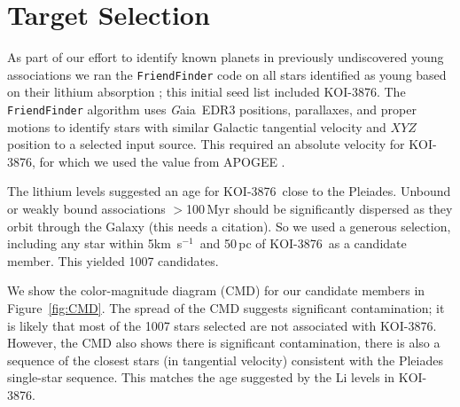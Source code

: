 \documentclass[twocolumn]{aastex631}
\newcommand{\starname}{KOI-3876}
\newcommand\kms{km~s$^{-1}$}
\newcommand{\gaia}{{\textit Gaia}}
\begin{document}
\section{Target Selection}\label{sec:target}

As part of our effort to identify known planets in previously undiscovered young associations we ran the \texttt{FriendFinder} code \citep{THYMEV} on all stars identified as young based on their lithium absorption \citep{2018ApJ...855..115B}; this initial seed list included \starname. The \texttt{FriendFinder} algorithm uses \gaia\ EDR3 positions, parallaxes, and proper motions to identify stars with similar Galactic tangential velocity and $XYZ$ position to a selected input source. This required an absolute velocity for \starname, for which we used the value from APOGEE \citep[-26.79\kms,][]{2020AJ....160..120J}. 

The lithium levels suggested an age for \starname\ close to the Pleiades. Unbound or weakly bound associations $>$100\,Myr should be significantly dispersed as they orbit through the Galaxy (this needs a citation). So we used a generous selection, including any star within 5\kms\ and 50\,pc of \starname\ as a candidate member. This yielded 1007 candidates.

We show the color-magnitude diagram (CMD) for our candidate members in Figure~\ref{fig:CMD}. The spread of the CMD suggests significant contamination; it is likely that most of the 1007 stars selected are not associated with \starname. However, the CMD also shows  there is significant contamination, there is also a sequence of the closest stars (in tangential velocity) consistent with the Pleiades single-star sequence. This matches the age suggested by the Li levels in \starname.
\end{document}
